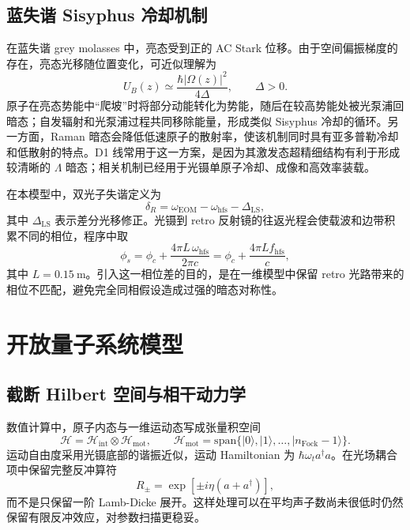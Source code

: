 \documentclass[UTF8,a4paper,12pt]{ctexart}
\newcommand{\ket}[1]{\ensuremath{|#1\rangle}}
\begin{document}
\subsection{蓝失谐 Sisyphus 冷却机制}

在蓝失谐 grey molasses 中，亮态受到正的 AC Stark 位移。由于空间偏振梯度的存在，亮态光移随位置变化，可近似理解为
\begin{equation}
U_B(z)\simeq \frac{\hbar|\Omega(z)|^2}{4\Delta},\qquad \Delta>0.
\end{equation}
原子在亮态势能中“爬坡”时将部分动能转化为势能，随后在较高势能处被光泵浦回暗态；自发辐射和光泵浦过程共同移除能量，形成类似 Sisyphus 冷却的循环。另一方面，Raman 暗态会降低低速原子的散射率，使该机制同时具有亚多普勒冷却和低散射的特点。D1 线常用于这一方案，是因为其激发态超精细结构有利于形成较清晰的 $\Lambda$ 暗态；相关机制已经用于光镊单原子冷却、成像和高效率装载\cite{brown2019,blodgett2023}。

在本模型中，双光子失谐定义为
\begin{equation}
\delta_R
=\omega_{\mathrm{EOM}}-\omega_{\mathrm{hfs}}-\Delta_{\mathrm{LS}},
\end{equation}
其中 $\Delta_{\mathrm{LS}}$ 表示差分光移修正。光镊到 retro 反射镜的往返光程会使载波和边带积累不同的相位，程序中取
\begin{equation}
\phi_s=\phi_c+\frac{4\pi L\,\omega_{\mathrm{hfs}}}{2\pi c}
=\phi_c+\frac{4\pi L f_{\mathrm{hfs}}}{c},
\label{eq:phase}
\end{equation}
其中 $L=0.15~\mathrm{m}$。引入这一相位差的目的，是在一维模型中保留 retro 光路带来的相位不匹配，避免完全同相假设造成过强的暗态对称性。

\section{开放量子系统模型}

\subsection{截断 Hilbert 空间与相干动力学}

数值计算中，原子内态与一维运动态写成张量积空间
\[
\mathcal{H}=\mathcal{H}_{\mathrm{int}}\otimes\mathcal{H}_{\mathrm{mot}},
\qquad
\mathcal{H}_{\mathrm{mot}}=\mathrm{span}\{\ket{0},\ket{1},\ldots,\ket{n_{\mathrm{Fock}}-1}\}.
\]
运动自由度采用光镊底部的谐振近似，运动 Hamiltonian 为 $\hbar\omega_t a^\dagger a$。在光场耦合项中保留完整反冲算符
\begin{equation}
R_{\pm}=\exp\!\left[\pm i\eta(a+a^\dagger)\right],
\label{eq:recoil}
\end{equation}
而不是只保留一阶 Lamb-Dicke 展开。这样处理可以在平均声子数尚未很低时仍然保留有限反冲效应，对参数扫描更稳妥。
\end{document}
